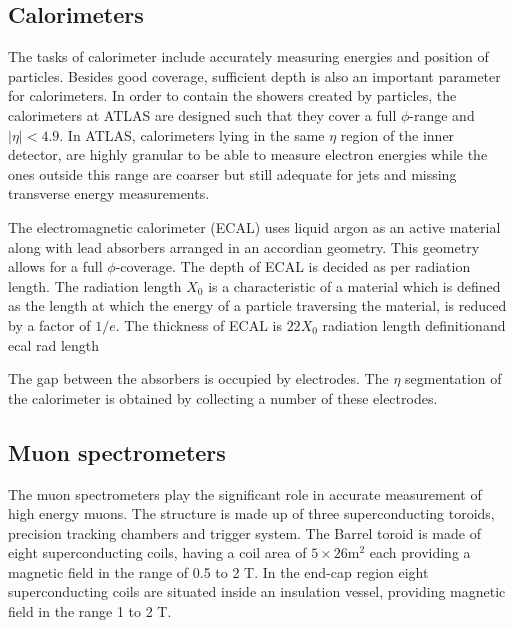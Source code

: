 \subsection{Calorimeters}
The tasks of calorimeter include accurately measuring energies and position of particles. Besides good coverage, sufficient depth is also an important parameter for calorimeters.
In order to contain the showers created by particles, the calorimeters at ATLAS are designed such that they cover a full $\phi$-range and $|\eta|<4.9$.  In ATLAS, 
calorimeters lying in the same $\eta$ region of the inner detector, are highly granular to be able to measure electron energies while the ones outside this range are coarser
but still adequate for jets and missing transverse energy measurements.

The electromagnetic calorimeter (ECAL) uses liquid argon as an active material along with lead absorbers arranged in an accordian geometry. This geometry allows for a full $\phi$-coverage.
The depth of ECAL is decided as per radiation length. The radiation length $X_0$ is a characteristic of a material which is defined as the length at which the energy of a 
particle traversing the material, is reduced by a factor of $1/e$. The thickness of ECAL is $22 X_0$
radiation length definitionand ecal rad length



The gap between the absorbers is occupied by electrodes. The $\eta$ segmentation of the calorimeter is obtained by collecting a number of these electrodes. 


\subsection{Muon spectrometers}
The muon spectrometers play the significant role in accurate measurement of high energy muons. The structure is made up of three superconducting toroids, 
precision tracking chambers and trigger system. The Barrel toroid is made of eight superconducting coils, having a coil area of $5 \times 26 \text{m}^2$ each 
providing a magnetic field in the range of 0.5 to 2 T. In the end-cap region eight superconducting coils are situated inside an insulation vessel, providing magnetic 
field in the range 1 to 2 T. 

